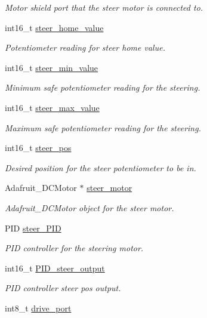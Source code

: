 \begin{DoxyCompactItemize}
\begin{DoxyCompactList}\small\item\em Motor shield port that the steer motor is connected to. \end{DoxyCompactList}\item 
int16\+\_\+t \hyperlink{structmodule__assembly_a47838ac5150269f7889f38e62027fd23}{steer\+\_\+home\+\_\+value}
\begin{DoxyCompactList}\small\item\em Potentiometer reading for steer home value. \end{DoxyCompactList}\item 
int16\+\_\+t \hyperlink{structmodule__assembly_a55a1e597e4e373ac95a03a32a65a2048}{steer\+\_\+min\+\_\+value}
\begin{DoxyCompactList}\small\item\em Minimum safe potentiometer reading for the steering. \end{DoxyCompactList}\item 
int16\+\_\+t \hyperlink{structmodule__assembly_a1d3511864da30dc6c827959b5204c5a3}{steer\+\_\+max\+\_\+value}
\begin{DoxyCompactList}\small\item\em Maximum safe potentiometer reading for the steering. \end{DoxyCompactList}\item 
int16\+\_\+t \hyperlink{structmodule__assembly_ac1ba4918f2a686b77c782e637a191348}{steer\+\_\+pos}
\begin{DoxyCompactList}\small\item\em Desired position for the steer potentiometer to be in. \end{DoxyCompactList}\item 
Adafruit\+\_\+\+D\+C\+Motor $\ast$ \hyperlink{structmodule__assembly_ace216696d34edd06eef0997f12c35771}{steer\+\_\+motor}
\begin{DoxyCompactList}\small\item\em Adafruit\+\_\+\+D\+C\+Motor object for the steer motor. \end{DoxyCompactList}\item 
P\+I\+D \hyperlink{structmodule__assembly_a2c3295e46bdfdacf68245649187688f8}{steer\+\_\+\+P\+I\+D}
\begin{DoxyCompactList}\small\item\em P\+I\+D controller for the steering motor. \end{DoxyCompactList}\item 
int16\+\_\+t \hyperlink{structmodule__assembly_a4acd38bec79f8a8afcd4c4ec357569da}{P\+I\+D\+\_\+steer\+\_\+output}
\begin{DoxyCompactList}\small\item\em P\+I\+D controller steer pos output. \end{DoxyCompactList}\item 
\hypertarget{structmodule__assembly_a7ff07d4e2b6fcebb3f00adef7380e22a}{}int8\+\_\+t \hyperlink{structmodule__assembly_a7ff07d4e2b6fcebb3f00adef7380e22a}{drive\+\_\+port}\label{structmodule__assembly_a7ff07d4e2b6fcebb3f00adef7380e22a}


\end{DoxyCompactItemize}
